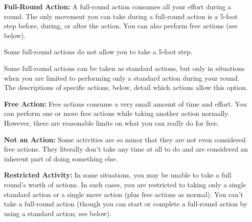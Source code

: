 \documentclass{article}
\begin{document}
\textbf{Full-Round Action:} A full-round action consumes all your effort during 
a round. The only movement you can take during a full-round action is a 5-foot 
step before, during, or after the action. You can also perform free actions (see 
below).

Some full-round actions do not allow you to take a 5-foot step.

Some full-round actions can be taken as standard actions, but only in situations 
when you are limited to performing only a standard action during your round. The 
descriptions of specific actions, below, detail which actions allow this option.

\textbf{Free Action:} Free actions consume a very small amount of time and effort. 
You can perform one or more free actions while taking another action normally. 
However, there are reasonable limits on what you can really do for free.

\textbf{Not an Action:} Some activities are so minor that they are not even considered 
free actions. They literally don't take any time at all to do and are considered 
an inherent part of doing something else.

\textbf{Restricted Activity:} In some situations, you may be unable to take a full 
round's worth of actions. In such cases, you are restricted to taking only a single 
standard action or a single move action (plus free actions as normal). You can't 
take a full-round action (though you can start or complete a full-round action 
by using a standard action; see below).
\end{document}
